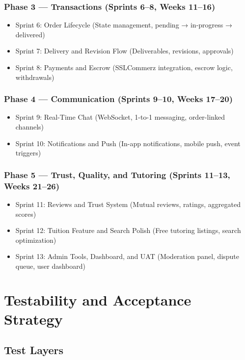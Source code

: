 \documentclass[a4paper,12pt]{article}
\begin{document}
\subsubsection{Phase 3 --- Transactions (Sprints 6--8, Weeks 11--16)}
\begin{itemize}
    \item Sprint 6: Order Lifecycle (State management, pending → in-progress → delivered)
    \item Sprint 7: Delivery and Revision Flow (Deliverables, revisions, approvals)
    \item Sprint 8: Payments and Escrow (SSLCommerz integration, escrow logic, withdrawals)
\end{itemize}

\subsubsection{Phase 4 --- Communication (Sprints 9--10, Weeks 17--20)}
\begin{itemize}
    \item Sprint 9: Real-Time Chat (WebSocket, 1-to-1 messaging, order-linked channels)
    \item Sprint 10: Notifications and Push (In-app notifications, mobile push, event triggers)
\end{itemize}

\subsubsection{Phase 5 --- Trust, Quality, and Tutoring (Sprints 11--13, Weeks 21--26)}
\begin{itemize}
    \item Sprint 11: Reviews and Trust System (Mutual reviews, ratings, aggregated scores)
    \item Sprint 12: Tuition Feature and Search Polish (Free tutoring listings, search optimization)
    \item Sprint 13: Admin Tools, Dashboard, and UAT (Moderation panel, dispute queue, user dashboard)
\end{itemize}

\section{Testability and Acceptance Strategy}

\subsection{Test Layers}
\end{document}
